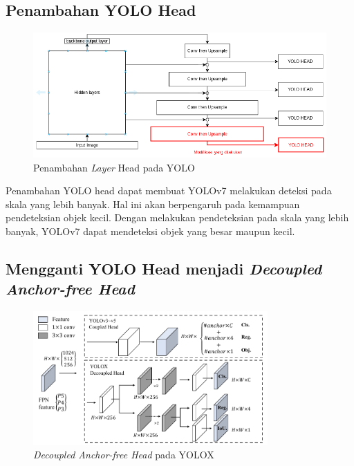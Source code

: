   \subsection{Penambahan YOLO Head}
    \begin{figure}[H]
      \centering
      \includegraphics[scale=0.65]{figures/addmorehead.png}
      \caption{Penambahan \emph{Layer} Head pada YOLO}
      \label{fig:addmorehead}
    \end{figure}
    Penambahan YOLO head dapat membuat YOLOv7 melakukan deteksi pada skala yang lebih banyak.
    Hal ini akan berpengaruh pada kemampuan pendeteksian objek kecil.
    Dengan melakukan pendeteksian pada skala yang lebih banyak, YOLOv7 dapat mendeteksi objek yang besar maupun kecil.

  \subsection{Mengganti YOLO Head menjadi \emph{Decoupled Anchor-free Head}}
    \begin{figure}[H]
      \centering
      \includegraphics[width=0.8\textwidth]{figures/anchorfree-yolox.png}
      \caption{\emph{Decoupled Anchor-free Head} pada YOLOX \parencite{yolox}}
      \label{fig:anchorfree}
    \end{figure}

